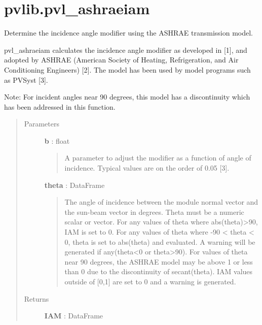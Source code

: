 \documentclass[letterpaper,10pt,english]{sphinxmanual}
\begin{document}
\section{pvlib.pvl\_ashraeiam}
\label{stubs/pvlib.pvl_ashraeiam::doc}\label{stubs/pvlib.pvl_ashraeiam:pvlib-pvl-ashraeiam}

\begin{fulllineitems}
\label{stubs/pvlib.pvl_ashraeiam:pvlib.pvl_ashraeiam}
Determine the incidence angle modifier using the ASHRAE transmission model.

pvl\_ashraeiam calculates the incidence angle modifier as developed in
{[}1{]}, and adopted by ASHRAE (American Society of Heating, Refrigeration,
and Air Conditioning Engineers) {[}2{]}. The model has been used by model
programs such as PVSyst {[}3{]}.

Note: For incident angles near 90 degrees, this model has a
discontinuity which has been addressed in this function.
\begin{quote}\begin{description}
\item[{Parameters}] \leavevmode
\textbf{b} : float
\begin{quote}

A parameter to adjust the modifier as a function of angle of
incidence. Typical values are on the order of 0.05 {[}3{]}.
\end{quote}

\textbf{theta} : DataFrame
\begin{quote}

The angle of incidence between the module normal vector and the
sun-beam vector in degrees. Theta must be a numeric scalar or vector.
For any values of theta where abs(theta)\textgreater{}90, IAM is set to 0. For any
values of theta where -90 \textless{} theta \textless{} 0, theta is set to abs(theta) and
evaluated. A warning will be generated if any(theta\textless{}0 or theta\textgreater{}90).
For values of theta near 90 degrees, the ASHRAE model may be above 1
or less than 0 due to the discontinuity of secant(theta). IAM values
outside of {[}0,1{]} are set to 0 and a warning is generated.
\end{quote}

\item[{Returns}] \leavevmode
\textbf{IAM} : DataFrame
\begin{quote}


\end{quote}
\end{description}
\end{quote}
\end{fulllineitems}
\end{document}
